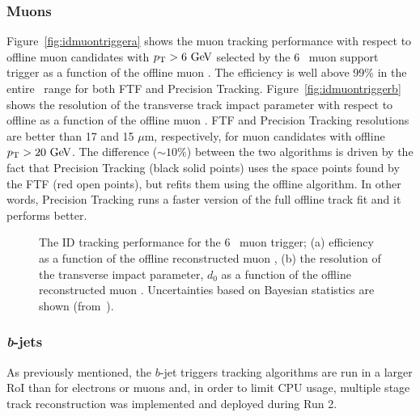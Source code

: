 				\subsubsection*{Muons}

					Figure~\ref{fig:idmuontriggera} shows the muon tracking performance with respect to offline muon candidates with $\pt > 6 \GeV$ selected by the 6 \GeV\ muon support trigger as a function of the offline muon \pt. The efficiency is well above 99\% in the entire \pt\ range for both \ac{FTF} and Precision Tracking. Figure~\ref{fig:idmuontriggerb} shows the resolution of the transverse track impact parameter with respect to offline as a function of the offline muon \pt. \ac{FTF} and Precision Tracking resolutions are better than 17 and 15 $\mu$m, respectively, for muon candidates with offline $\pt > 20 \GeV$. The difference ($\sim 10\%$) between the two algorithms is driven by the fact that Precision Tracking (black solid points) uses the space points found by the \ac{FTF} (red open points), but refits them using the offline algorithm. In other words, Precision Tracking runs a faster version of the full offline track fit and it performs better.

					\begin{figure}[!htb]
						\begin{center}
							\hspace{0.05\textwidth}
						\end{center}
						\caption{ 
						The ID tracking performance for the 6 \GeV\ muon trigger;
						(a) efficiency as a function of the offline reconstructed muon \pt,  
						(b) the resolution of the transverse impact parameter, $d_{0}$  as a function of the offline reconstructed muon \pt. Uncertainties based on Bayesian statistics are shown (from~\cite{ATLASTrigger2015}).}
						\label{fig:idmuontrigger}
					\end{figure}



				\subsubsection*{\emph{b}-jets}
				\label{par:bjets_perf}

					As previously mentioned, the $b$-jet triggers tracking algorithms are run in a larger \ac{RoI} than for electrons or muons and, in order to limit \ac{CPU} usage, multiple stage track reconstruction was implemented and deployed during Run 2.

